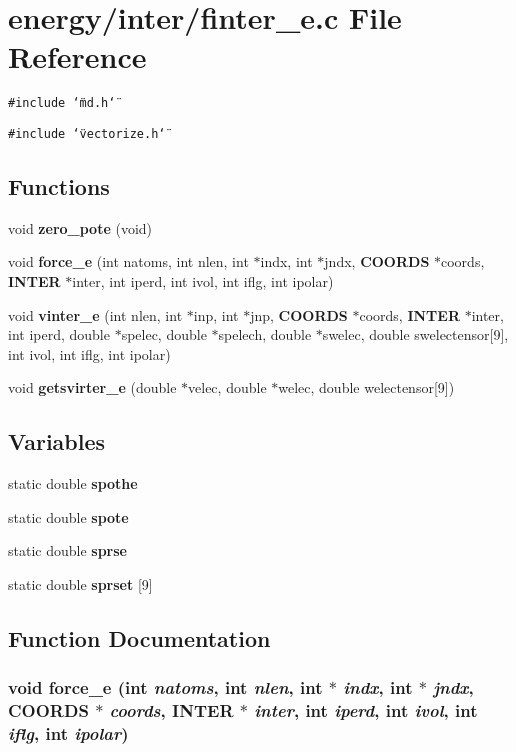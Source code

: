\section{energy/inter/finter\_\-e.c File Reference}
\label{finter__e_8c}
{\tt \#include \char`\"{}md.h\char`\"{}}\par
{\tt \#include \char`\"{}vectorize.h\char`\"{}}\par
\subsection*{Functions}
\begin{CompactItemize}
\item 
void {\bf zero\_\-pote} (void)
\item 
void {\bf force\_\-e} (int natoms, int nlen, int $\ast$indx, int $\ast$jndx, {\bf COORDS} $\ast$coords, {\bf INTER} $\ast$inter, int iperd, int ivol, int iflg, int ipolar)
\item 
void {\bf vinter\_\-e} (int nlen, int $\ast$inp, int $\ast$jnp, {\bf COORDS} $\ast$coords, {\bf INTER} $\ast$inter, int iperd, double $\ast$spelec, double $\ast$spelech, double $\ast$swelec, double swelectensor[9], int ivol, int iflg, int ipolar)
\item 
void {\bf getsvirter\_\-e} (double $\ast$velec, double $\ast$welec, double welectensor[9])
\end{CompactItemize}
\subsection*{Variables}
\begin{CompactItemize}
\item 
static double {\bf spothe}
\item 
static double {\bf spote}
\item 
static double {\bf sprse}
\item 
static double {\bf sprset} [9]
\end{CompactItemize}


\subsection{Function Documentation}
\subsubsection{\setlength{\rightskip}{0pt plus 5cm}void force\_\-e (int {\em natoms}, int {\em nlen}, int $\ast$ {\em indx}, int $\ast$ {\em jndx}, {\bf COORDS} $\ast$ {\em coords}, {\bf INTER} $\ast$ {\em inter}, int {\em iperd}, int {\em ivol}, int {\em iflg}, int {\em ipolar})}\label{finter__e_8c_67bef09fb63a6a41578b9d666686ab95}


